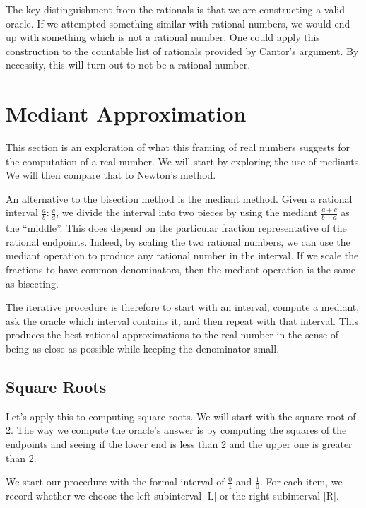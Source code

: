 \documentclass[12pt]{article}
\theoremstyle{remark}
\begin{document}
The key distinguishment from the rationals is that we are constructing a valid oracle. If we attempted something similar with rational numbers, we would end up with something which is not a rational number. One could apply this construction to the countable list of rationals provided by Cantor's argument. By necessity, this will turn out to not be a rational number. 

\section{Mediant Approximation}\label{sec:mediant}

This section is an exploration of what this framing of real numbers suggests for the computation of a real number. We will start by exploring the use of mediants. We will then compare that to Newton's method. 

An alternative to the bisection method is the mediant method. Given a rational interval $\frac{a}{b} : \frac{c}{d}$, we divide the interval into two pieces by using the mediant $\frac{a+c}{b+d}$ as the ``middle''. This does depend on the particular fraction representative of the rational endpoints. Indeed, by scaling the two rational numbers, we can use the mediant operation to produce any rational number in the interval. If we scale the fractions to have common denominators, then the mediant operation is the same as bisecting. 

The iterative procedure is therefore to start with an interval, compute a mediant, ask the oracle which interval contains it, and then repeat with that interval. This produces the best rational approximations to the real number in the sense of being as close as possible while keeping the denominator small. 

\subsection{Square Roots}

Let's apply this to computing square roots. We will start with the square root of 2. The way we compute the oracle's answer is by computing the squares of the endpoints and seeing if the lower end is less than 2 and the upper one is greater than 2.

We start our procedure with the formal interval of $\tfrac{0}{1}$ and $\tfrac{1}{0}$. For each item, we record whether we choose the left subinterval [L] or the right subinterval [R]. 
\end{document}
